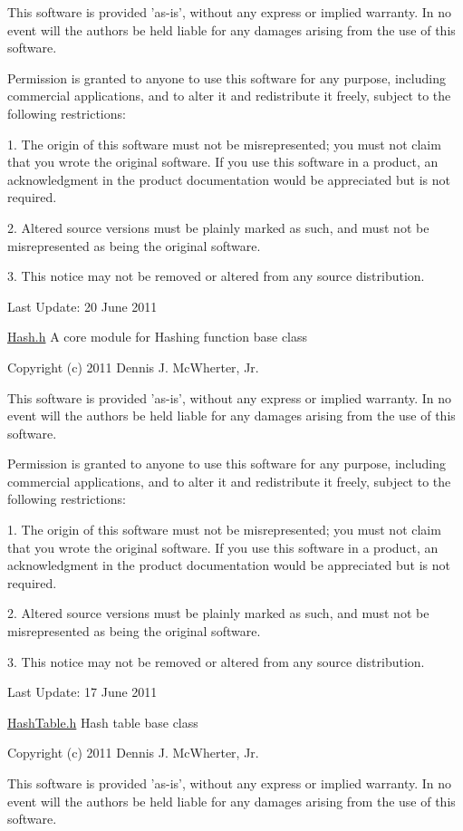 This software is provided 'as-\/is', without any express or implied warranty. In no event will the authors be held liable for any damages arising from the use of this software.

Permission is granted to anyone to use this software for any purpose, including commercial applications, and to alter it and redistribute it freely, subject to the following restrictions:

1. The origin of this software must not be misrepresented; you must not claim that you wrote the original software. If you use this software in a product, an acknowledgment in the product documentation would be appreciated but is not required.

2. Altered source versions must be plainly marked as such, and must not be misrepresented as being the original software.

3. This notice may not be removed or altered from any source distribution.

Last Update: 20 June 2011

\hyperlink{_hash_8h_source}{Hash.h} A core module for Hashing function base class

Copyright (c) 2011 Dennis J. McWherter, Jr.

This software is provided 'as-\/is', without any express or implied warranty. In no event will the authors be held liable for any damages arising from the use of this software.

Permission is granted to anyone to use this software for any purpose, including commercial applications, and to alter it and redistribute it freely, subject to the following restrictions:

1. The origin of this software must not be misrepresented; you must not claim that you wrote the original software. If you use this software in a product, an acknowledgment in the product documentation would be appreciated but is not required.

2. Altered source versions must be plainly marked as such, and must not be misrepresented as being the original software.

3. This notice may not be removed or altered from any source distribution.

Last Update: 17 June 2011

\hyperlink{_hash_table_8h_source}{HashTable.h} Hash table base class

Copyright (c) 2011 Dennis J. McWherter, Jr.

This software is provided 'as-\/is', without any express or implied warranty. In no event will the authors be held liable for any damages arising from the use of this software.


